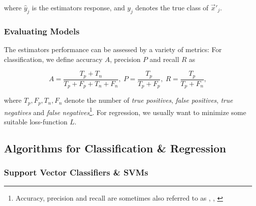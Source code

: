 where $\hat y_j$ is the estimators response, and $y_j$ denotes the true class of $\vec x'_j$.

\subsubsection{Evaluating Models}


The estimators performance can be assessed by a variety of metrics: For classification, we define accuracy $A$, precision $P$ and recall $R$ as

\begin{equation}
A = \frac{T_p + T_n}{T_p + F_p + T_n + F_n}, \; P = \frac{T_p}{T_p + F_p}, \; R = \frac{T_p}{T_p + F_n},
\end{equation}


where $T_p, F_p, T_n, F_n$ denote the number of \emph{true positives}, \emph{false positives}, \emph{true negatives} and \emph{false negatives}\footnote{Accuracy, precision and recall are sometimes also referred to as \emph{}, \emph{}, \emph{}}. For regression, we usually want to minimize some suitable loss-function $L$.

\subsection{Algorithms for Classification \& Regression}
\label{subsec:algorithms-classification-and-regression}
\subsubsection{Support Vector Classifiers \& SVMs}

